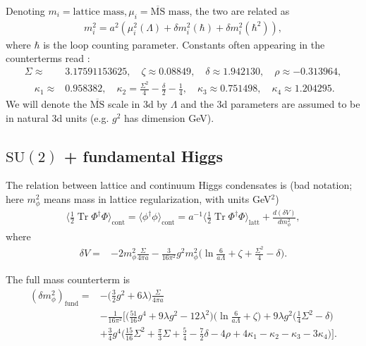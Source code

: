 \documentclass[11pt,a4paper]{article}
\newcommand\Tr{\operatorname{Tr}}
\newcommand\MSbar{$\overline{\text{MS}}$ } %
\newcommand\he[1]{#1^\dagger}%
\newcommand\gr[1]{\mathrm{#1}}%
\newcommand\lauri[1]{{\color{myorange}#1}}
\begin{document}
Denoting $m_i = \text{lattice mass}, \mu_i = \text{\MSbar mass}$, the two are related as 
\begin{align}
m^2_i = a^2 (\mu^2_i(\Lambda) + \delta m^2_i(\hbar) + \delta m^2_i(\hbar^2) ),
\end{align}
where $\hbar$ is the loop counting parameter. Constants often appearing in the counterterms read \cite{Laine:1997dy}: 
\begin{align}
\Sigma \approx& 3.17591153625, \quad \zeta \approx 0.08849, \quad \delta \approx 1.942130, \quad \rho \approx -0.313964, \nonumber \\ 
\quad \kappa_1 \approx& 0.958382, \quad \kappa_2 = \frac{\Sigma^2}{4} - \frac{\delta}{2} - \frac14, \quad \kappa_3 \approx 0.751498, \quad \kappa_4 \approx 1.204295.
\end{align}
We will denote the \MSbar scale in 3d by $\Lambda$ and the 3d parameters are assumed to be in natural 3d units (e.g. $g^2$ has dimension GeV).

\subsection{$\gr{SU(2)}$ + fundamental Higgs}

The relation between lattice and continuum Higgs condensates is \lauri{(bad notation; here $m^2_\phi$ means mass in lattice regularization, with units GeV$^2$)}
\begin{align}
\langle \frac12\Tr\he\Phi\Phi\rangle_\text{cont} = \langle\phi^\dagger\phi\rangle_\text{cont} = a^{-1}\langle \frac12\Tr\he\Phi\Phi\rangle_\text{latt} + \frac{d(\delta V)}{dm^2_\phi}, 
\end{align}
where 
\begin{align}
\label{eq:vacuumCT_higgs}
\delta V =& - 2 m^2_\phi \frac{\Sigma}{4\pi a} - \frac{3}{16\pi^2} g^2 m^2_\phi \Big( \ln \frac{6}{a \Lambda} +\zeta + \frac{\Sigma^2}{4} - \delta \Big).
\end{align}

The full mass counterterm is
\begin{align}
(\delta m^2_\phi)_\text{fund} =& -\Big(\frac32 g^2 + 6\lambda\Big) \frac{\Sigma}{4\pi a} \nonumber \\
&- \frac{1}{16\pi^2}\Big[ \Big( \frac{51}{16}g^4 + 9\lambda g^2 - 12\lambda^2 \Big)\Big( \ln \frac{6}{a\Lambda}+\zeta \Big)
 + 9\lambda g^2 \Big( \frac14 \Sigma^2 - \delta \Big) \nonumber \\ 
& + \frac34 g^4 \Big( \frac{15}{16}\Sigma^2 + \frac{\pi}{3} \Sigma + \frac54 - \frac72 \delta - 4\rho +4\kappa_1 - \kappa_2 - \kappa_3 - 3\kappa_4  \Big) \Big].
\end{align}
\end{document}
